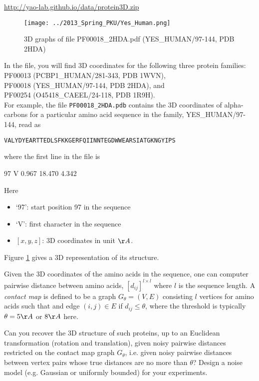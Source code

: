 \documentclass[11pt]{article}
\begin{document}
\url{http://yao-lab.github.io/data/protein3D.zip}

\begin{figure}[htbp]
\begin{center}
\texttt{[image: ../2013\_Spring\_PKU/Yes\_Human.png]}  
\caption{3D graphs of file PF00018\_2HDA.pdf (YES\_HUMAN/97-144, PDB 2HDA)}
\label{yes_human}
\end{center}
\end{figure}

\noindent In the file, you will find 3D coordinates for the following three protein families: 
\subitem PF00013 (PCBP1\_HUMAN/281-343, PDB 1WVN), \\
\subitem PF00018 (YES\_HUMAN/97-144, PDB 2HDA), and \\
\subitem PF00254 (O45418\_CAEEL/24-118, PDB 1R9H). \\

For example, the file {\tt PF00018\_2HDA.pdb} contains the 3D coordinates of alpha-carbons for a particular amino acid sequence in the family, YES\_HUMAN/97-144, read as

{\tt{VALYDYEARTTEDLSFKKGERFQIINNTEGDWWEARSIATGKNGYIPS}}

\noindent where the first line in the file is 

97	V	0.967	18.470	4.342

\noindent Here
\begin{itemize}
\item `97': start position 97 in the sequence
\item `V': first character in the sequence
\item $[x,y,z]$: 3D coordinates in unit $\AA$.
\end{itemize}

\noindent Figure \ref{yes_human} gives a 3D representation of its structure. 


Given the 3D coordinates of the amino acids in the sequence, one can computer pairwise distance between amino acids, $[d_{ij}]^{l\times l}$ where $l$ is the sequence length. A \emph{contact map} is defined to be a graph $G_\theta=(V,E)$ consisting $l$ vertices for amino acids such that and edge $(i,j)\in E$ if $d_{ij} \leq \theta$, where the threshold is typically $\theta=5\AA$ or $8\AA$ here. 

Can you recover the 3D structure of such proteins, up to an Euclidean transformation (rotation and translation), given noisy pairwise distances restricted on the contact map graph $G_\theta$, i.e. given noisy pairwise distances between vertex pairs whose true distances are no more than $\theta$? Design a noise model (e.g. Gaussian or uniformly bounded) for your experiments. 
\end{document}
